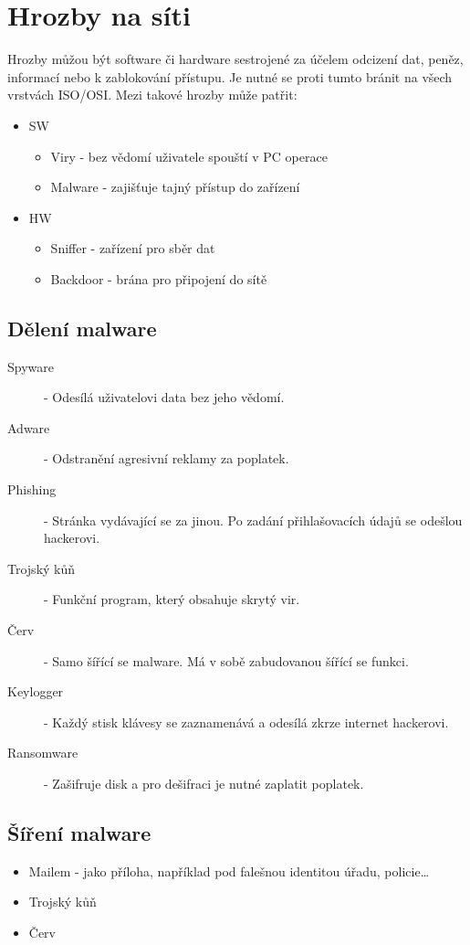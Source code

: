 \section{Hrozby na síti}
\label{sec:hrozby-na-siti}
Hrozby můžou být software či hardware sestrojené za účelem odcizení dat, peněz, informací nebo k zablokování přístupu.
Je nutné se proti tumto bránit na všech vrstvách ISO/OSI.
Mezi takové hrozby může patřit:
\begin{itemize}
  \item SW
        \begin{itemize}
          \item Viry - bez vědomí uživatele spouští v PC operace
          \item Malware - zajišťuje tajný přístup do zařízení
        \end{itemize}
  \item HW
        \begin{itemize}
          \item Sniffer - zařízení pro sběr dat
          \item Backdoor - brána pro připojení do sítě
        \end{itemize}
\end{itemize}
\subsection{Dělení malware}
\begin{description}
  \item[Spyware]- Odesílá uživatelovi data bez jeho vědomí.
  \item[Adware]- Odstranění agresivní reklamy za poplatek.
  \item[Phishing]- Stránka vydávající se za jinou. Po zadání přihlašovacích údajů se odešlou hackerovi.
  \item[Trojský kůň]- Funkční program, který obsahuje skrytý vir.
  \item[Červ]- Samo šířící se malware. Má v sobě zabudovanou šířící se funkci.
  \item[Keylogger]- Každý stisk klávesy se zaznamenává a odesílá zkrze internet hackerovi.
  \item[Ransomware]- Zašifruje disk a pro dešifraci je nutné zaplatit poplatek.
\end{description}
\subsection{Šíření malware}
\begin{itemize}
  \item Mailem - jako příloha, například pod falešnou identitou úřadu, policie\dots
  \item Trojský kůň
  \item Červ
\end{itemize}
